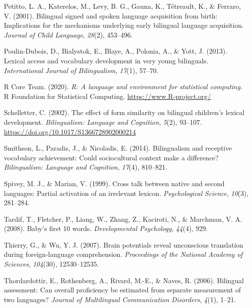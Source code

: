 \documentclass[
  letterpaper,
  DIV=11,
  numbers=noendperiod]{scrartcl}
\newlength{\cslhangindent}
\newlength{\cslentryspacingunit} %
\newenvironment{CSLReferences}[2] %
 {%
  \setlength{\parindent}{0pt}
  \ifodd #1
  \let\oldpar\par
  \def\par{\hangindent=\cslhangindent\oldpar}
  \fi
  \setlength{\parskip}{#2\cslentryspacingunit}
 }%
 {}
\begin{document}
\begin{CSLReferences}{1}{0}
\leavevmode{}%
Petitto, L. A., Katerelos, M., Levy, B. G., Gauna, K., Tétreault, K., \&
Ferraro, V. (2001). Bilingual signed and spoken language acquisition
from birth: Implications for the mechanisms underlying early bilingual
language acquisition. \emph{Journal of Child Language}, \emph{28}(2),
453--496.

\leavevmode{}%
Poulin-Dubois, D., Bialystok, E., Blaye, A., Polonia, A., \& Yott, J.
(2013). Lexical access and vocabulary development in very young
bilinguals. \emph{International Journal of Bilingualism}, \emph{17}(1),
57--70.

\leavevmode{}%
R Core Team. (2020). \emph{R: A language and environment for statistical
computing}. R Foundation for Statistical Computing.
\url{https://www.R-project.org/}

\leavevmode{}%
Schelletter, C. (2002). The effect of form similarity on bilingual
children's lexical development. \emph{Bilingualism: Language and
Cognition}, \emph{5}(2), 93--107.
\url{https://doi.org/10.1017/S1366728902000214}

\leavevmode{}%
Smithson, L., Paradis, J., \& Nicoladis, E. (2014). Bilingualism and
receptive vocabulary achievement: Could sociocultural context make a
difference? \emph{Bilingualism: Language and Cognition}, \emph{17}(4),
810--821.

\leavevmode{}%
Spivey, M. J., \& Marian, V. (1999). Cross talk between native and
second languages: Partial activation of an irrelevant lexicon.
\emph{Psychological Science}, \emph{10}(3), 281--284.

\leavevmode{}%
Tardif, T., Fletcher, P., Liang, W., Zhang, Z., Kaciroti, N., \&
Marchman, V. A. (2008). Baby's first 10 words. \emph{Developmental
Psychology}, \emph{44}(4), 929.

\leavevmode{}%
Thierry, G., \& Wu, Y. J. (2007). Brain potentials reveal unconscious
translation during foreign-language comprehension. \emph{Proceedings of
the National Academy of Sciences}, \emph{104}(30), 12530--12535.

\leavevmode{}%
Thordardottir, E., Rothenberg, A., Rivard, M.-E., \& Naves, R. (2006).
Bilingual assessment: Can overall proficiency be estimated from separate
measurement of two languages? \emph{Journal of Multilingual
Communication Disorders}, \emph{4}(1), 1--21.


\end{CSLReferences}
\end{document}
